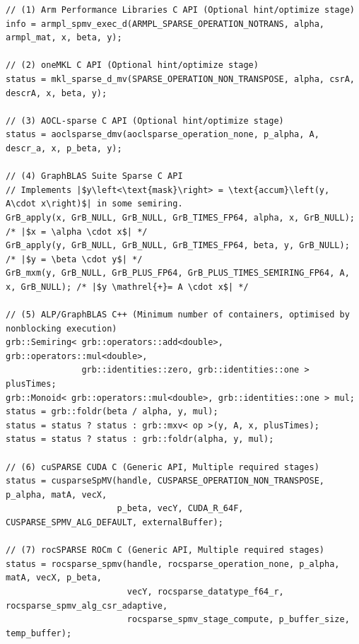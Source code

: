 \begin{listing}[htbp]
\caption{Detailed overview of execution APIs across vendor and domain libraries for IEEE 754 double-precision Sparse Matrix-Vector Multiplication (\texttt{SpMV}): $y = \alpha\cdot\text{op}\left(A\right)\cdot x + \beta\cdot y $}
\label{lst:spmv_comparison}
\begin{verbatim}
// (1) Arm Performance Libraries C API (Optional hint/optimize stage)
info = armpl_spmv_exec_d(ARMPL_SPARSE_OPERATION_NOTRANS, alpha, armpl_mat, x, beta, y);

// (2) oneMKL C API (Optional hint/optimize stage)
status = mkl_sparse_d_mv(SPARSE_OPERATION_NON_TRANSPOSE, alpha, csrA, descrA, x, beta, y);

// (3) AOCL-sparse C API (Optional hint/optimize stage)
status = aoclsparse_dmv(aoclsparse_operation_none, p_alpha, A, descr_a, x, p_beta, y);

// (4) GraphBLAS Suite Sparse C API
// Implements |$y\left<\text{mask}\right> = \text{accum}\left(y, A\cdot x\right)$| in some semiring.
GrB_apply(x, GrB_NULL, GrB_NULL, GrB_TIMES_FP64, alpha, x, GrB_NULL); /* |$x = \alpha \cdot x$| */
GrB_apply(y, GrB_NULL, GrB_NULL, GrB_TIMES_FP64, beta, y, GrB_NULL); /* |$y = \beta \cdot y$| */
GrB_mxm(y, GrB_NULL, GrB_PLUS_FP64, GrB_PLUS_TIMES_SEMIRING_FP64, A, x, GrB_NULL); /* |$y \mathrel{+}= A \cdot x$| */

// (5) ALP/GraphBLAS C++ (Minimum number of containers, optimised by nonblocking execution)
grb::Semiring< grb::operators::add<double>, grb::operators::mul<double>, 
               grb::identities::zero, grb::identities::one > plusTimes;
grb::Monoid< grb::operators::mul<double>, grb::identities::one > mul;
status = grb::foldr(beta / alpha, y, mul);
status = status ? status : grb::mxv< op >(y, A, x, plusTimes);
status = status ? status : grb::foldr(alpha, y, mul);

// (6) cuSPARSE CUDA C (Generic API, Multiple required stages)
status = cusparseSpMV(handle, CUSPARSE_OPERATION_NON_TRANSPOSE, p_alpha, matA, vecX, 
                      p_beta, vecY, CUDA_R_64F, CUSPARSE_SPMV_ALG_DEFAULT, externalBuffer);

// (7) rocSPARSE ROCm C (Generic API, Multiple required stages)
status = rocsparse_spmv(handle, rocsparse_operation_none, p_alpha, matA, vecX, p_beta, 
                        vecY, rocsparse_datatype_f64_r, rocsparse_spmv_alg_csr_adaptive, 
                        rocsparse_spmv_stage_compute, p_buffer_size, temp_buffer);


\end{verbatim}
\end{listing}
